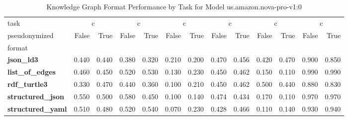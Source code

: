\begin{table}
\caption{Knowledge Graph Format Performance by Task for Model us.amazon.nova-pro-v1:0}
\label{tab:results_us.amazon.nova-pro-v1:0}
\begin{tabular}{lrrrrrrrrrrrr}
\toprule
task & \multicolumn{2}{c}{c}{AggByRelation} & \multicolumn{2}{c}{c}{AggNeighborProperties} & \multicolumn{2}{c}{c}{HighestDegreeNode} & \multicolumn{2}{c}{c}{Overall} & \multicolumn{2}{c}{c}{ShortestPath} & \multicolumn{2}{c}{c}{TripleRetrieval} \\
pseudonymized & False & True & False & True & False & True & False & True & False & True & False & True \\
format &  &  &  &  &  &  &  &  &  &  &  &  \\
\midrule
\textbf{json_ld3} & 0.440 & 0.440 & 0.380 & 0.320 & 0.210 & 0.200 & 0.470 & 0.456 & 0.420 & 0.470 & 0.900 & 0.850 \\
\textbf{list_of_edges} & 0.460 & 0.450 & 0.520 & 0.530 & 0.130 & 0.230 & 0.450 & 0.462 & 0.150 & 0.110 & 0.990 & 0.990 \\
\textbf{rdf_turtle3} & 0.330 & 0.470 & 0.440 & 0.360 & 0.100 & 0.210 & 0.450 & 0.462 & 0.500 & 0.440 & 0.880 & 0.830 \\
\textbf{structured_json} & 0.550 & 0.500 & 0.580 & 0.450 & 0.100 & 0.140 & 0.474 & 0.434 & 0.170 & 0.110 & 0.970 & 0.970 \\
\textbf{structured_yaml} & 0.510 & 0.480 & 0.520 & 0.540 & 0.070 & 0.230 & 0.428 & 0.466 & 0.110 & 0.140 & 0.930 & 0.940 \\
\bottomrule
\end{tabular}
\end{table}
